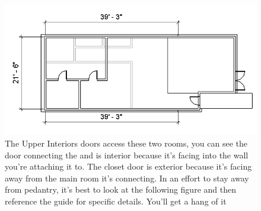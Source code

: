 \documentclass{tufte-book} %
\begin{document}
\begin{enumerate}
		\begin{figure}
			\includegraphics[width=\linewidth]{revitupperinteriordoors.png}
			\caption[Upper Interior Doors]{The Upper Interiors doors access these two rooms, you can see the door connecting the  and  is interior because it's facing into the wall you're attaching it to. The closet door is exterior because it's facing away from the main room it's connecting. In an effort to stay away from pedantry, it's best to look at the following figure and then reference the guide for specific details. You'll get a hang of it}
			\label{fig:revupperinterdoors}
		\end{figure}
		

\end{enumerate}
\end{document}
